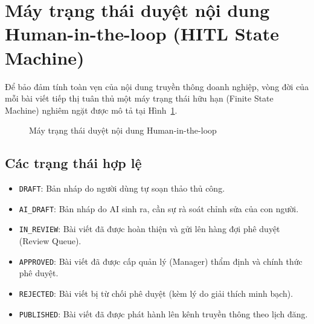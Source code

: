 \section{Máy trạng thái duyệt nội dung Human-in-the-loop (HITL State Machine)}

Để bảo đảm tính toàn vẹn của nội dung truyền thông doanh nghiệp, vòng đời của mỗi bài viết tiếp thị tuân thủ một máy trạng thái hữu hạn (Finite State Machine) nghiêm ngặt được mô tả tại Hình~\ref{fig:v9-content-state}.

\begin{figure}[H]
\centering

\caption{Máy trạng thái duyệt nội dung Human-in-the-loop}
\label{fig:v9-content-state}
\end{figure}

\subsection{Các trạng thái hợp lệ}
\begin{itemize}
  \item \texttt{DRAFT}: Bản nháp do người dùng tự soạn thảo thủ công.
  \item \texttt{AI\_DRAFT}: Bản nháp do AI sinh ra, cần sự rà soát chỉnh sửa của con người.
  \item \texttt{IN\_REVIEW}: Bài viết đã được hoàn thiện và gửi lên hàng đợi phê duyệt (Review Queue).
  \item \texttt{APPROVED}: Bài viết đã được cấp quản lý (Manager) thẩm định và chính thức phê duyệt.
  \item \texttt{REJECTED}: Bài viết bị từ chối phê duyệt (kèm lý do giải thích minh bạch).
  \item \texttt{PUBLISHED}: Bài viết đã được phát hành lên kênh truyền thông theo lịch đăng.
\end{itemize}

